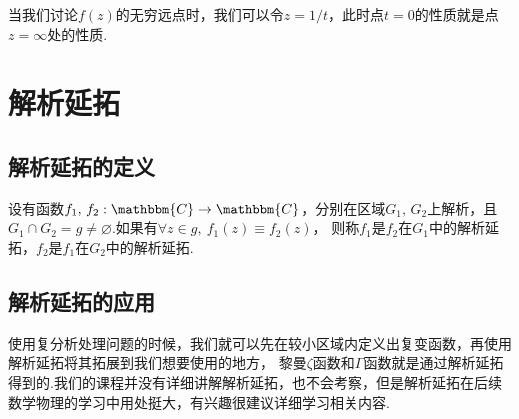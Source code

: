         \begin{note}
            当我们讨论$f(z)$的无穷远点时，我们可以令$z=1/t$，此时点$t=0$的性质就是点$z=\infty$处的性质.
        \end{note}


\section{解析延拓}

    \subsection{解析延拓的定义}
        \begin{definition}[解析延拓]\label{def:analytic_continuation}
            设有函数$f_1,\,f_2:\mathbbm{C}\to\mathbbm{C}$，分别在区域$G_1,\,G_2$上解析，且$G_1\cap G_2=g\neq \varnothing$.如果有$\forall z\in g,\ f_1(z)\equiv f_2(z)$，
            则称$f_1$是$f_2$在$G_1$中的解析延拓，$f_2$是$f_1$在$G_2$中的解析延拓.
        \end{definition}

    \subsection{解析延拓的应用}
        使用复分析处理问题的时候，我们就可以先在较小区域内定义出复变函数，再使用解析延拓将其拓展到我们想要使用的地方，
        黎曼$\zeta $函数和$\Gamma$函数就是通过解析延拓得到的.我们的课程并没有详细讲解解析延拓，也不会考察，但是解析延拓在后续数学物理的学习中用处挺大，有兴趣很建议详细学习相关内容.
